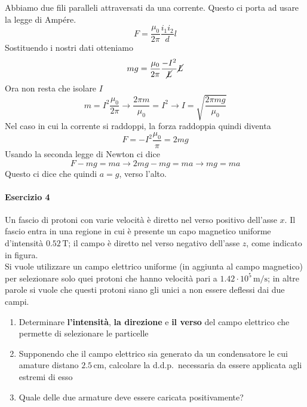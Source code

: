 Abbiamo due fili paralleli attraversati da una corrente. Questo ci porta ad usare la legge di Ampére.
\begin{equation*}
  F = \frac{\mu_0}{2\pi}\frac{i_1i_2}{d}l
\end{equation*}
Sostituendo i nostri dati otteniamo
\begin{equation*}
  mg = \frac{\mu_0}{2\pi}\frac{-I^2}{\cancel{L}}\cancel{L}
\end{equation*}
Ora non resta che isolare $I$
\begin{equation*}
  m=I^2\frac{\mu_0}{2\pi} \rightarrow \frac{2\pi m}{\mu_0}=I^2 \rightarrow 
  \boxed{I = \sqrt{\frac{2\pi mg}{\mu_0}}}
\end{equation*}
Nel caso in cui la corrente si raddoppi, la forza raddoppia quindi diventa
\begin{equation*}
  F=-I^2\frac{\mu_0}{\pi}=2mg
\end{equation*}
Usando la seconda legge di Newton ci dice
\begin{equation*}
  F-mg=ma\rightarrow 2mg-mg = ma \rightarrow mg=ma
\end{equation*}
Questo ci dice che quindi $\boxed{a = g}$, verso l'alto.

\paragraph{Esercizio 4}
Un fascio di protoni con varie velocità è diretto nel verso positivo dell'asse $x$. Il fascio
entra in una regione in cui è presente un capo magnetico uniforme d'intensità $0.52\,\text{T}$;
il campo è diretto nel verso negativo dell'asse $z$, come indicato in figura.\\
Si vuole utilizzare un campo elettrico uniforme (in aggiunta al campo magnetico) per selezionare
solo quei protoni che hanno velocità pari a $1.42\cdot10^5\,\text{m/s}$; in altre parole si
vuole che questi protoni siano gli unici a non essere deflessi dai due campi.
\begin{enumerate}
  \item Determinare \textbf{l'intensità},  \textbf{la direzione} e \textbf{il verso} del campo
    elettrico che permette di selezionare le particelle
  \item Supponendo che il campo elettrico sia generato da un condensatore le cui amature distano
    $2.5\,\text{cm}$, calcolare la d.d.p.~necessaria da essere applicata agli estremi di esso
  \item Quale delle due armature deve essere caricata positivamente?
\end{enumerate}

